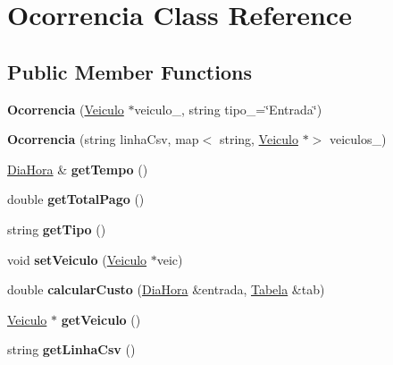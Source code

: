 \hypertarget{classOcorrencia}{}\section{Ocorrencia Class Reference}
\label{classOcorrencia}
\subsection*{Public Member Functions}
\begin{DoxyCompactItemize}
\item 
\mbox{\label{classOcorrencia_ac0f3e0a7f16ff0476ec134d08bc40344}} 
{\bfseries Ocorrencia} (\hyperlink{classVeiculo}{Veiculo} $\ast$veiculo\+\_\+, string tipo\+\_\+=\char`\"{}Entrada\char`\"{})
\item 
\mbox{\label{classOcorrencia_a32f7f1e1229b2d2e77e7815c83e911d8}} 
{\bfseries Ocorrencia} (string linha\+Csv, map$<$ string, \hyperlink{classVeiculo}{Veiculo} $\ast$$>$ veiculos\+\_\+)
\item 
\mbox{\label{classOcorrencia_a652d16616d41da6eebe0d218a7ece37e}} 
\hyperlink{classDiaHora}{Dia\+Hora} \& {\bfseries get\+Tempo} ()
\item 
\mbox{\label{classOcorrencia_a77daa27eca565a5aad2dcfd4755a2768}} 
double {\bfseries get\+Total\+Pago} ()
\item 
\mbox{\label{classOcorrencia_af2744c586ea32102bc8dd89ce4192890}} 
string {\bfseries get\+Tipo} ()
\item 
\mbox{\label{classOcorrencia_a12fe07269e6cc82752042299277e64ac}} 
void {\bfseries set\+Veiculo} (\hyperlink{classVeiculo}{Veiculo} $\ast$veic)
\item 
\mbox{\label{classOcorrencia_a68df8d663bbd10ee538760acea2fc7bc}} 
double {\bfseries calcular\+Custo} (\hyperlink{classDiaHora}{Dia\+Hora} \&entrada, \hyperlink{classTabela}{Tabela} \&tab)
\item 
\mbox{\label{classOcorrencia_a96323e7537ae63e80c1a08431ad1197a}} 
\hyperlink{classVeiculo}{Veiculo} $\ast$ {\bfseries get\+Veiculo} ()
\item 
\mbox{\label{classOcorrencia_a8ae7b0f71ec6484d50063ccda24a76d6}} 
string {\bfseries get\+Linha\+Csv} ()
\end{DoxyCompactItemize}

